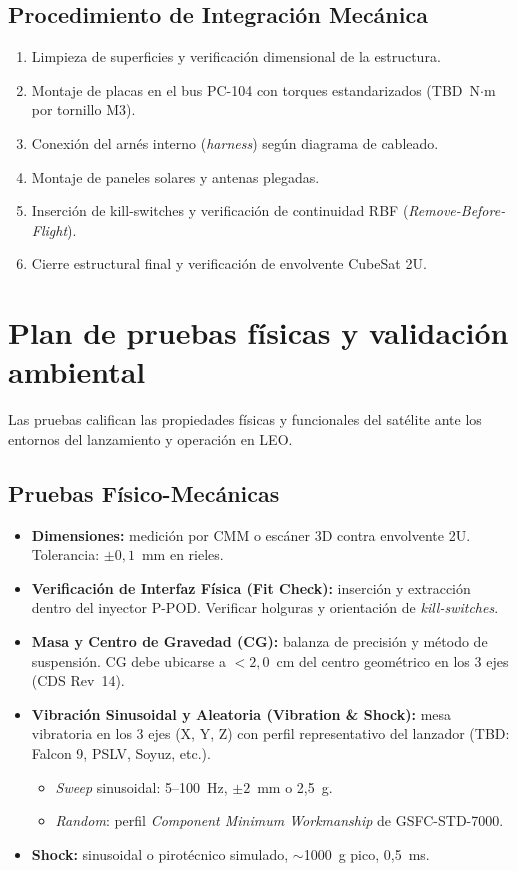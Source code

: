 \subsection{Procedimiento de Integración Mecánica}
\begin{enumerate}
    \item Limpieza de superficies y verificación dimensional de la estructura.
    \item Montaje de placas en el bus PC-104 con torques estandarizados (TBD~N$\cdot$m por tornillo M3).
    \item Conexión del arnés interno (\textit{harness}) según diagrama de cableado.
    \item Montaje de paneles solares y antenas plegadas.
    \item Inserción de kill-switches y verificación de continuidad RBF (\textit{Remove-Before-Flight}).
    \item Cierre estructural final y verificación de envolvente CubeSat 2U.
\end{enumerate}

\section{Plan de pruebas físicas y validación ambiental}
Las pruebas califican las propiedades físicas y funcionales del satélite ante los entornos del lanzamiento y operación en LEO.

\subsection{Pruebas Físico-Mecánicas}
\begin{itemize}
    \item \textbf{Dimensiones:} medición por CMM o escáner 3D contra envolvente 2U. Tolerancia: $\pm 0{,}1$~mm en rieles.

    \item \textbf{Verificación de Interfaz Física (Fit Check):} inserción y extracción dentro del inyector P-POD. Verificar holguras y orientación de \textit{kill-switches}.

    \item \textbf{Masa y Centro de Gravedad (CG):} balanza de precisión y método de suspensión. CG debe ubicarse a $<2{,}0$~cm del centro geométrico en los 3 ejes (CDS Rev~14).

    \item \textbf{Vibración Sinusoidal y Aleatoria (Vibration \& Shock):} mesa vibratoria en los 3 ejes (X, Y, Z) con perfil representativo del lanzador (TBD: Falcon 9, PSLV, Soyuz, etc.).
    \begin{itemize}
        \item \textit{Sweep} sinusoidal: 5--100~Hz, $\pm 2$~mm o 2{,}5~g.
        \item \textit{Random}: perfil \textit{Component Minimum Workmanship} de GSFC-STD-7000.
    \end{itemize}

    \item \textbf{Shock:} sinusoidal o pirotécnico simulado, $\sim$1000~g pico, 0{,}5~ms.
\end{itemize}

